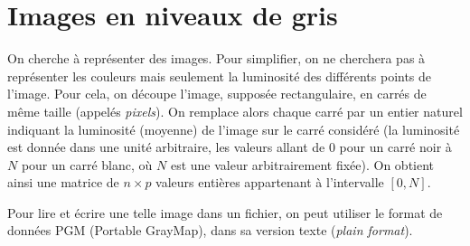\exer{}
\setcounter{numques}{0}

\section*{Images en niveaux de gris}

On cherche à représenter des  images. Pour simplifier, on ne cherchera
pas  à  représenter les  couleurs  mais  seulement  la luminosité  des
différents points de l'image.  Pour cela, on découpe l'image, supposée
rectangulaire,  en carrés  de même  taille (appelés \emph{pixels}). On
remplace  alors chaque
carré  par un  entier  naturel indiquant  la  luminosité (moyenne)  de
l'image sur le carré considéré (la luminosité est donnée dans une
unité arbitraire, les valeurs allant de $0$ pour un carré noir à $N$
pour un carré blanc, où $N$ est une valeur arbitrairement fixée). On
obtient ainsi une matrice de $n\times p$ valeurs entières appartenant
à l'intervalle $[0, N]$.

Pour lire et écrire une telle image dans un fichier, on peut utiliser
le format de données PGM (Portable GrayMap), dans sa version texte
(\textit{plain format}).


